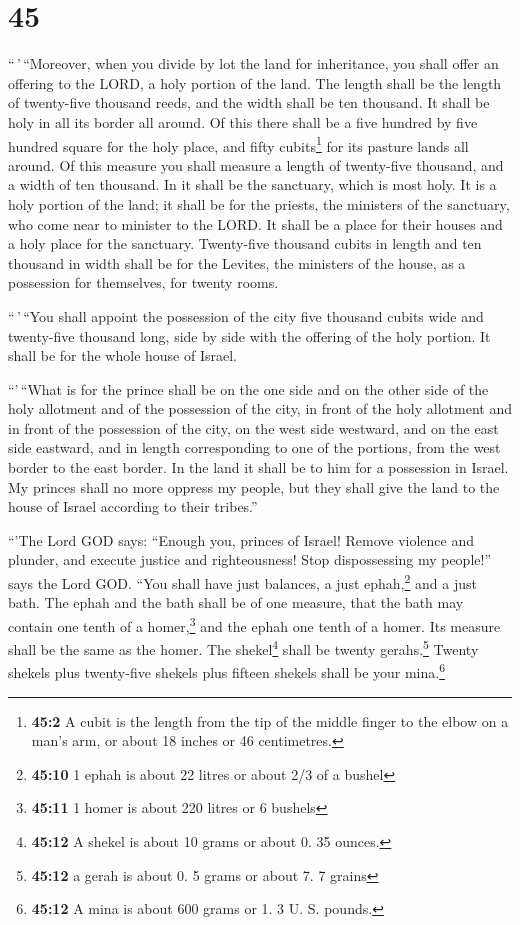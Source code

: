 \hypertarget{section-43}{%
\section{45}\label{section-43}}

 ``\,'\,``Moreover, when you divide by lot the land for
inheritance, you shall offer an offering to the LORD, a holy portion of
the land. The length shall be the length of twenty-five thousand reeds,
and the width shall be ten thousand. It shall be holy in all its border
all around.  Of this there shall be a five hundred by five
hundred square for the holy place, and fifty cubits\footnote{\textbf{45:2}
  A cubit is the length from the tip of the middle finger to the elbow
  on a man's arm, or about 18 inches or 46 centimetres.} for its pasture
lands all around.  Of this measure you shall measure a
length of twenty-five thousand, and a width of ten thousand. In it shall
be the sanctuary, which is most holy.  It is a holy
portion of the land; it shall be for the priests, the ministers of the
sanctuary, who come near to minister to the LORD. It shall be a place
for their houses and a holy place for the sanctuary. 
Twenty-five thousand cubits in length and ten thousand in width shall be
for the Levites, the ministers of the house, as a possession for
themselves, for twenty rooms.

 ``\,'\,``You shall appoint the possession of the city
five thousand cubits wide and twenty-five thousand long, side by side
with the offering of the holy portion. It shall be for the whole house
of Israel.

 ``'\,``What is for the prince shall be on the one side
and on the other side of the holy allotment and of the possession of the
city, in front of the holy allotment and in front of the possession of
the city, on the west side westward, and on the east side eastward, and
in length corresponding to one of the portions, from the west border to
the east border.  In the land it shall be to him for a
possession in Israel. My princes shall no more oppress my people, but
they shall give the land to the house of Israel according to their
tribes.''

 ``'The Lord GOD says: ``Enough you, princes of Israel!
Remove violence and plunder, and execute justice and righteousness! Stop
dispossessing my people!'' says the Lord GOD.  ``You
shall have just balances, a just ephah,\footnote{\textbf{45:10} 1 ephah
  is about 22 litres or about 2/3 of a bushel} and a just bath.
 The ephah and the bath shall be of one measure, that the
bath may contain one tenth of a homer,\footnote{\textbf{45:11} 1 homer
  is about 220 litres or 6 bushels} and the ephah one tenth of a homer.
Its measure shall be the same as the homer.  The
shekel\footnote{\textbf{45:12} A shekel is about 10 grams or about 0. 35
  ounces.} shall be twenty gerahs.\footnote{\textbf{45:12} a gerah is
  about 0. 5 grams or about 7. 7 grains} Twenty shekels plus twenty-five
shekels plus fifteen shekels shall be your mina.\footnote{\textbf{45:12}
  A mina is about 600 grams or 1. 3 U. S. pounds.}

